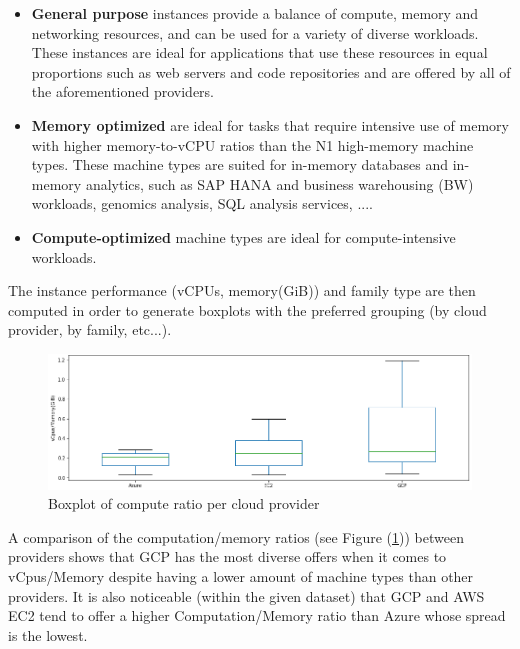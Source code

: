 \documentclass[11pt]{article}
\begin{document}
\begin{itemize}
    \item \textbf{General purpose} instances provide a balance of compute, memory and networking resources, and can be used for a variety of diverse workloads. These instances are ideal for applications that use these resources in equal proportions such as web servers and code repositories and are offered by all of the aforementioned providers.
    \item \textbf{Memory optimized} are ideal for tasks that require intensive use of memory with higher memory-to-vCPU ratios than the N1 high-memory machine types. These machine types are suited for in-memory databases and in-memory analytics, such as SAP HANA and business warehousing (BW) workloads, genomics analysis, SQL analysis services, ....
    \item \textbf{Compute-optimized} machine types are ideal for compute-intensive workloads.
\end{itemize}

The instance performance (vCPUs, memory(GiB)) and family type are then computed in order to generate boxplots with the preferred grouping (by cloud provider, by family, etc...). 

\begin{figure}[h]
    \centering
    \includegraphics[width=\textwidth]{bench_computing_provider.png}
    \caption{Boxplot of compute ratio per cloud provider}
    \label{fig:bench-ratio-provider}
\end{figure}

A comparison of the computation/memory ratios (see Figure (\ref{fig:bench-ratio-provider})) between providers shows that GCP has the most diverse offers when it comes to vCpus/Memory despite having a lower amount of machine types than other providers. It is also noticeable (within the given dataset) that GCP and AWS EC2 tend to offer a higher Computation/Memory ratio than Azure whose spread is the lowest.
\end{document}
